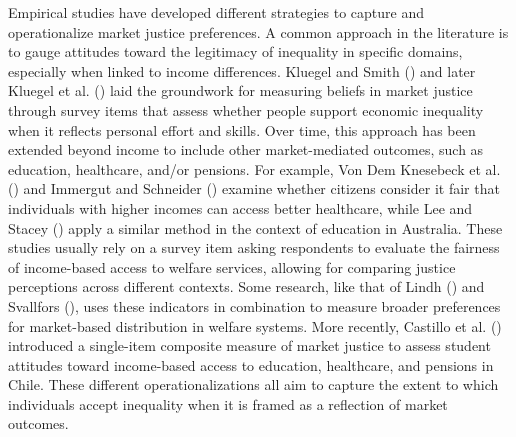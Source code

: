 \documentclass[
  12pt,
]{article}
\begin{document}
Empirical studies have developed different strategies to capture and
operationalize market justice preferences. A common approach in the
literature is to gauge attitudes toward the legitimacy of inequality in
specific domains, especially when linked to income differences. Kluegel
and Smith () and later Kluegel
et al. () laid the
groundwork for measuring beliefs in market justice through survey items
that assess whether people support economic inequality when it reflects
personal effort and skills. Over time, this approach has been extended
beyond income to include other market-mediated outcomes, such as
education, healthcare, and/or pensions. For example, Von Dem Knesebeck
et al. () and Immergut and
Schneider () examine whether
citizens consider it fair that individuals with higher incomes can
access better healthcare, while Lee and Stacey
() apply a similar method in the
context of education in Australia. These studies usually rely on a
survey item asking respondents to evaluate the fairness of income-based
access to welfare services, allowing for comparing justice perceptions
across different contexts. Some research, like that of Lindh
() and Svallfors
(), uses these indicators
in combination to measure broader preferences for market-based
distribution in welfare systems. More recently, Castillo et al.
() introduced a
single-item composite measure of market justice to assess student
attitudes toward income-based access to education, healthcare, and
pensions in Chile. These different operationalizations all aim to
capture the extent to which individuals accept inequality when it is
framed as a reflection of market outcomes.
\end{document}
